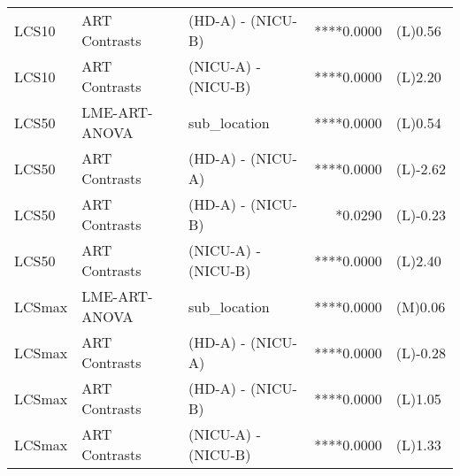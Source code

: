 \begin{table}
\begin{tabular*}{\linewidth}{@{\extracolsep{\fill}}lllrl}
LCS10 & ART Contrasts & (HD-A) - (NICU-B) & ****0.0000 & (L)0.56 \\ 
LCS10 & ART Contrasts & (NICU-A) - (NICU-B) & ****0.0000 & (L)2.20 \\ 
LCS50 & LME-ART-ANOVA & sub\_location & ****0.0000 & (L)0.54 \\ 
LCS50 & ART Contrasts & (HD-A) - (NICU-A) & ****0.0000 & (L)-2.62 \\ 
LCS50 & ART Contrasts & (HD-A) - (NICU-B) & *0.0290 & (L)-0.23 \\ 
LCS50 & ART Contrasts & (NICU-A) - (NICU-B) & ****0.0000 & (L)2.40 \\ 
LCSmax & LME-ART-ANOVA & sub\_location & ****0.0000 & (M)0.06 \\ 
LCSmax & ART Contrasts & (HD-A) - (NICU-A) & ****0.0000 & (L)-0.28 \\ 
LCSmax & ART Contrasts & (HD-A) - (NICU-B) & ****0.0000 & (L)1.05 \\ 
LCSmax & ART Contrasts & (NICU-A) - (NICU-B) & ****0.0000 & (L)1.33 \\ 
\bottomrule
\end{tabular*}
\end{table}

